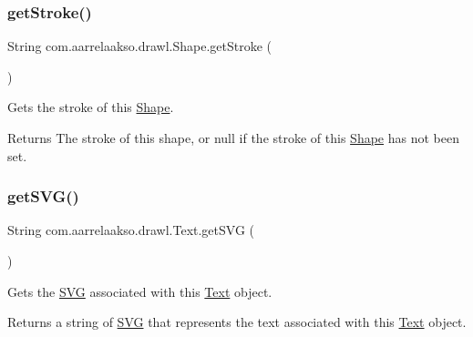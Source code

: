\subsubsection{\texorpdfstring{get\+Stroke()}{getStroke()}}
{\footnotesize\ttfamily String com.\+aarrelaakso.\+drawl.\+Shape.\+get\+Stroke (\begin{DoxyParamCaption}{ }\end{DoxyParamCaption})\hspace{0.3cm}{\ttfamily [inherited]}}

Gets the stroke of this \hyperlink{classcom_1_1aarrelaakso_1_1drawl_1_1_shape}{Shape}.

\begin{DoxyReturn}{Returns}
The stroke of this shape, or null if the stroke of this \hyperlink{classcom_1_1aarrelaakso_1_1drawl_1_1_shape}{Shape} has not been set. 
\end{DoxyReturn}
\mbox{\label{classcom_1_1aarrelaakso_1_1drawl_1_1_text_ab1a6091b007ea4da41de26bc8c6ea021}} 
\subsubsection{\texorpdfstring{get\+S\+V\+G()}{getSVG()}}
{\footnotesize\ttfamily String com.\+aarrelaakso.\+drawl.\+Text.\+get\+S\+VG (\begin{DoxyParamCaption}{ }\end{DoxyParamCaption})}

Gets the \hyperlink{classcom_1_1aarrelaakso_1_1drawl_1_1_s_v_g}{S\+VG} associated with this \hyperlink{classcom_1_1aarrelaakso_1_1drawl_1_1_text}{Text} object.

\begin{DoxyReturn}{Returns}
a string of \hyperlink{classcom_1_1aarrelaakso_1_1drawl_1_1_s_v_g}{S\+VG} that represents the text associated with this \hyperlink{classcom_1_1aarrelaakso_1_1drawl_1_1_text}{Text} object. 
\end{DoxyReturn}
\mbox{\label{classcom_1_1aarrelaakso_1_1drawl_1_1_text_a3f110fefbe3f5b9bdff79b6cabce18ba}} 
